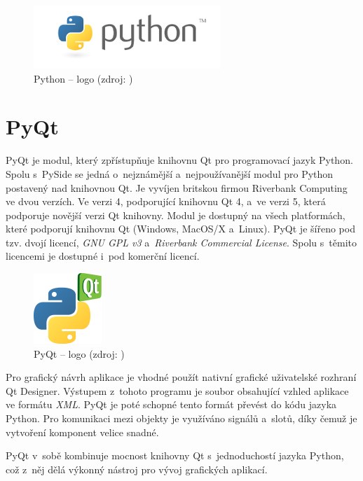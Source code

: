 \documentclass[a4paper,12pt,oneside]{book}
\begin{document}
\begin{figure}[htb]
\centering
\includegraphics[scale=.6]{images/python-logo.png}
\caption[Python -- logo]{Python -- logo (zdroj: \cite{python_web})}
\end{figure}

\newpage
\section{PyQt}

PyQt je modul, který zpřístupňuje knihovnu Qt pro programovací jazyk
Python. Spolu s~PySide se jedná o~nejznámější a~nejpoužívanější modul
pro Python postavený nad knihovnou Qt. Je vyvíjen britskou firmou
Riverbank Computing ve dvou verzích. Ve verzi 4, podporující knihovnu
Qt 4, a~ve verzi 5, která podporuje novější verzi Qt knihovny. Modul
je dostupný na všech platformách, které podporují knihovnu Qt
(Windows, MacOS/X a~Linux). PyQt je šířeno pod tzv. dvojí licencí,
\textit{GNU GPL v3} a~\textit{Riverbank Commercial License}. Spolu
s~těmito licencemi je dostupné i~pod komerční licencí.

\begin{figure}[htb]
\centering
\includegraphics[scale=1]{images/pyqt-logo.png}
\caption[PyQt -- logo]{PyQt -- logo (zdroj: \cite{pyqt_wiki})}
\end{figure}

Pro grafický návrh aplikace je vhodné použít nativní grafické
uživatelské rozhraní Qt Designer. Výstupem z~tohoto programu je soubor
obsahující vzhled aplikace ve formátu \textit{XML}. PyQt je poté
schopné tento formát převést do kódu jazyka Python. Pro komunikaci
mezi objekty je využíváno signálů a~slotů, díky čemuž je vytvoření
komponent velice snadné.

PyQt v~sobě kombinuje mocnost knihovny Qt s~jednoduchostí jazyka
Python, což z~něj dělá výkonný nástroj pro vývoj grafických aplikací.
\cite{pyqt} \cite{pyqt_wiki} \cite{pyqt_book}
\end{document}
